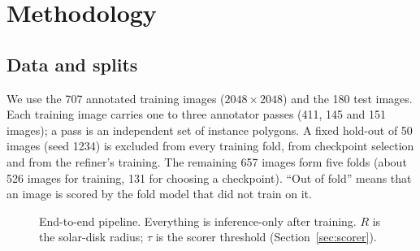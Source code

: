 \documentclass[sigconf]{acmart}
\begin{document}
\section{Methodology}\label{sec:methodology}

\subsection{Data and splits}
We use the 707 annotated training images ($2048{\times}2048$) and the 180 test images. Each training image carries one to three annotator passes (411, 145 and 151 images); a pass is an independent set of instance polygons. A fixed hold-out of 50 images (seed 1234) is excluded from every training fold, from checkpoint selection and from the refiner's training. The remaining 657 images form five folds (about 526 images for training, 131 for choosing a checkpoint). ``Out of fold'' means that an image is scored by the fold model that did not train on it.

\begin{figure}[t]
\centering
{}
\caption{End-to-end pipeline. Everything is inference-only after training. $R$ is the solar-disk radius; $\tau$ is the scorer threshold (Section~\ref{sec:scorer}).}
\label{fig:pipeline}
\end{figure}
\end{document}
